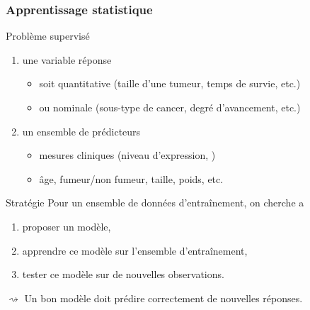 \documentclass{beamer}\usepackage[]{graphicx}\usepackage[]{color}
\begin{document}
\begin{frame}
  \frametitle{Apprentissage statistique}

  \begin{block}{Problème supervisé}
    \begin{enumerate}
    \item une variable \alert{réponse} 
      \begin{itemize}
      \item soit quantitative (taille d'une tumeur, temps de survie, etc.)
      \item ou nominale (sous-type de cancer, degré d'avancement, etc.)
      \end{itemize}
    \item un ensemble de \alert{prédicteurs} 
      \begin{itemize}
      \item mesures cliniques (niveau d'expression, )
      \item âge, fumeur/non fumeur, taille, poids, etc.
      \end{itemize}
    \end{enumerate}
  \end{block}

  \vfill

  \begin{block}{Stratégie} Pour un ensemble de données
    d'entraînement, on cherche a
    \begin{enumerate}
    \item proposer un modèle,
    \item apprendre ce modèle sur l'ensemble d'entraînement,
    \item tester ce modèle sur de nouvelles observations.
    \end{enumerate}
  \end{block}

  \vfill

  $\rightsquigarrow$ \alert{Un bon modèle doit prédire correctement de
    nouvelles réponses.}

\end{frame}
\end{document}
